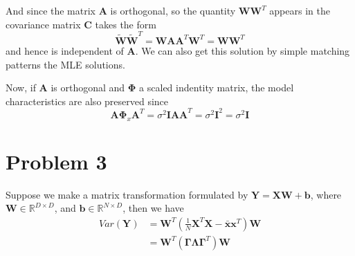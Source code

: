 \documentclass{article}
\begin{document}
And since the matrix $\bm{A}$ is orthogonal, so the quantity $\bm{WW}^T$ appears in the covariance matrix $\bm{C}$ takes the form
\begin{equation}
	\bm{\tilde{W}\tilde{W}}^T = \bm{WAA}^T\bm{W}^T = \bm{WW}^T
\end{equation}
and hence is independent of $\bm{A}$. We can also get this solution by simple matching patterns the MLE solutions.

Now, if $\bm{A}$ is orthogonal and $\bm{\Phi}$ a scaled indentity matrix, the model characteristics are also preserved since
\begin{equation}
	\bm{A\Phi}_x\bm{A}^T = \sigma^2\bm{IAA}^T = \sigma^2\bm{I}^2 = \sigma^2\bm{I}
\end{equation}
\section*{Problem 3}
Suppose we make a matrix transformation formulated by $\bm{Y} = \bm{XW}+\bm{b}$, where $\bm{W} \in \mathbb{R}^{D \times D}$, and $\bm{b} \in \mathbb{R}^{N \times D}$, then we have
\begin{equation}
	\begin{aligned}
		Var(\bm{Y}) 
		&= \bm{W}^T (\frac{1}{N}\bm{X}^T\bm{X} - \bm{\bar{x}}\bm{x}^T) \bm{W} \\
		&= \bm{W}^T (\bm{\Gamma \Lambda} \bm{\Gamma}^T) \bm{W}
	\end{aligned}
\end{equation}
\end{document}
